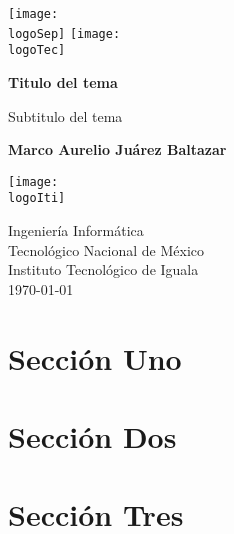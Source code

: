 \documentclass[a4paper, 12pt]{article}
\def\logoIti{~/Documents/TEC/Logos/itiguala.png}
\def\logoTec{~/Documents/TEC/Logos/tecnm.jpg}
\def\logoSep{~/Documents/TEC/Logos/sep.png}
\begin{document}
\begin{titlepage}
   \begin{center}
			 \texttt{[image: \\logoSep]}
			 \hspace{1in}
			 \texttt{[image: \\logoTec]}
       \vspace*{1in}

			 \large{\textbf{Titulo del tema}}

       \vspace{0.5cm}
       Subtitulo del tema
            
       \vspace{1.5cm}

       \textbf{Marco Aurelio Juárez Baltazar}

       \vspace{1.45in}
			 \texttt{[image: \\logoIti]}
       \vspace{1.45in}

       Ingeniería Informática\\\vspace{0.2cm}
       Tecnológico Nacional de México\\\vspace{0.2cm}
       Instituto Tecnológico de Iguala\\\vspace{0.2cm}
       \vspace{1cm}
       \today
            
   \end{center}
\end{titlepage}

\thispagestyle{empty}
\tableofcontents

\newpage
\setcounter{page}{1}

\section{Sección Uno}
\lipsum[1-1]
\section{Sección Dos}
\lipsum[1-1]
\section{Sección Tres}
\lipsum[1-1]
\end{document}
